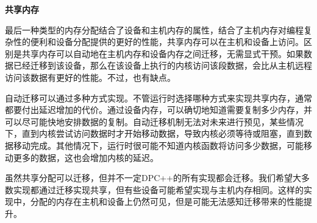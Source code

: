\hspace*{\fill} \par %
\textbf{共享内存}

最后一种类型的内存分配结合了设备和主机内存的属性，结合了主机内存对编程复杂性的便利和设备分配提供的更好的性能，共享内存可以在主机和设备上访问。区别是共享内存可以自动地在主机内存和设备内存之间迁移，无需显式干预。如果数据已经迁移到该设备，那么在该设备上执行的内核访问该段数据，会比从主机远程访问该数据有更好的性能。不过，也有缺点。\par

自动迁移可以通过多种方式实现。不管运行时选择哪种方式来实现共享内存，通常都要付出延迟增加的代价。通过设备内存，可以确切地知道需要复制多少内存，并可以尽可能快地安排数据的复制。自动迁移机制无法对未来进行预见，某些情况下，直到内核尝试访问数据时才开始移动数据，导致内核必须等待或阻塞，直到数据移动完成。其他情况下，运行时很可能不知道内核函数将访问多少数据，可能移动更多的数据，这也会增加内核的延迟。\par

虽然共享分配可以迁移，但并不一定DPC++的所有实现都会迁移。我们希望大多数实现都通过迁移实现共享，但有些设备可能希望实现与主机内存相同。这样的实现中，分配的内存在主机和设备上仍然可见，但是可能无法感知迁移带来的性能提升。\par






































